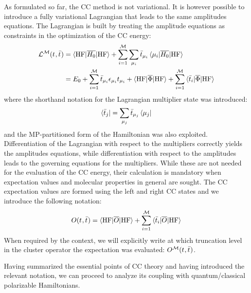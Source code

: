 As formulated so far, the \acs{CC} method is not variational. It is
however possible to introduce a fully variational Lagrangian that
leads to the same amplitudes equations. The Lagrangian is built by
treating the amplitude equations as constraints in the optimization of
the \acs{CC} energy:
\begin{equation}\label{eq:cc-lagrangian}
  \begin{aligned}
    \mathcal{L}^\mathcal{M}(t_{}, \bar{t}_{})
    &=
    \braket{\mathrm{HF} | \overline{H_0} | \mathrm{HF}}
    + \sum_{i=1}^{\mathcal{M}}\sum_{\mu_i}
    \bar{t}_{\mu_i}\braket{\mu_i | \overline{H_0} | \mathrm{HF}} \\
    &=
  E_0
  + \sum_{i=1}^{\mathcal{M}}\bar{t}_{\mu_i}\epsilon_{\mu_i}t_{\mu_i}
  + \braket{\mathrm{HF} | \overline{\Phi} | \mathrm{HF}}
  + \sum_{i=1}^{\mathcal{M}}\braket{\bar{t}_{i} | \overline{\Phi} | \mathrm{HF}}
  \end{aligned}
\end{equation}
where the shorthand notation for the Lagrangian multiplier state was
introduced:
\begin{equation}
  \bra{\bar{t}_{j}} = \sum_{\mu_j}\bar{t}_{\mu_j}\bra{\mu_j}
\end{equation}
and the \acs{MP}-partitioned form of the Hamiltonian was also exploited.
Differentiation of the Lagrangian with respect to the multipliers
correctly yields the amplitudes equations, while differentiation with
respect to the amplitudes leads to the governing equations for the
multipliers. While these are not needed for the evaluation of the
\acs{CC} energy, their calculation is mandatory when expectation values
and molecular properties in general are sought.
The \acs{CC} expectation values are formed using the left and
right \acs{CC} states and we introduce the following notation:
\begin{equation}
  O(t_{}, \bar{t}_{}) = \braket{\mathrm{HF} | \overline{O} | \mathrm{HF} }
  + \sum_{i=1}^{\mathcal{M}}\braket{\bar{t}_{i} | \overline{O} | \mathrm{HF} }
\end{equation}
When required by the context, we will explicitly write at which
truncation level in the cluster operator the expectation was evaluated:
$O^\mathcal{M}(t_{}, \bar{t}_{})$.

Having summarized the essential points of \acs{CC} theory and having
introduced the relevant notation, we can proceed to analyze its coupling
with quantum/classical polarizable Hamiltonians.

